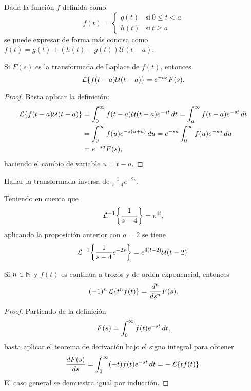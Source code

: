 \documentclass[../ecuaciones_diferenciales.tex]{subfiles}
\begin{document}
\begin{example}
	Dada la función \(f\) definida como
	\[f(t) =
		\begin{cases}
			g(t) & \mathrm{si}\ 0 \leq t < a \\
			h(t) & \mathrm{si}\ t \geq a
		\end{cases}
	\]
	se puede expresar de forma más concisa como
	\(f(t) = g(t) + (h(t)-g(t))\mathcal{U}(t-a)\).
\end{example}

\begin{proposition}
	Si \(F(s)\) es la transformada de Laplace de \(f(t)\), entonces
	\[\operatorname{\mathcal{L}}\{f(t-a)\mathcal{U}(t-a)\} = e^{-as}F(s).\]
	\begin{proof}
		Basta aplicar la definición:
		\begin{align*}
			\operatorname{\mathcal{L}}\{f(t-a)\mathcal{U}(t-a)\}
			 & = \int_0^\infty f(t-a)\mathcal{U}(t-a) e^{-st} \mathop{d\!} t
			= \int_a^\infty f(t-a)e^{-st} \mathop{d\!} t                     \\
			 & = \int_0^\infty f(u)e^{-s(u+a)} \mathop{d\!} u
			= e^{-sa} \int_0^\infty f(u) e^{-su} \mathop{d\!} u              \\
			 & = e^{-sa}F(s),
		\end{align*}
		haciendo el cambio de variable \(u = t - a\).
	\end{proof}
\end{proposition}

\begin{example}
	Hallar la transformada inversa de \(\frac{1}{s-4}e^{-2s}\).
\end{example}

\begin{solution}
	Teniendo en cuenta que
	\[\laplace^{-1}\left\{\frac{1}{s-4}\right\} = e^{4t},\]
	aplicando la proposición anterior con \(a=2\) se tiene
	\[\laplace^{-1}\left\{\frac{1}{s-4}e^{-2s}\right\} = e^{4(t-2)}\mathcal{U}(t-2).\]
\end{solution}

\begin{theorem}
	Si \(n \in \mathbb{N}\) y \(f(t)\) es continua a trozos y de orden exponencial, entonces
	\[(-1)^n\laplace\left\{t^nf(t)\right\} = \frac{\dif {}^n}{\dif s^n} F(s).\]
	\begin{proof}
		Partiendo de la definición
		\[F(s) = \int_0^\infty f(t)e^{-st} \mathop{d\!} t,\]
		basta aplicar el teorema de derivación bajo el signo integral para obtener
		\[\frac{\mathop{d\!} F(s)}{\mathop{d\!} s} = \int_0^\infty (-t)f(t)e^{-st} \mathop{d\!} t =
			-\operatorname{\mathcal{L}}\{tf(t)\}.\]
		El caso general se demuestra igual por inducción.
	\end{proof}
\end{theorem}
\end{document}
